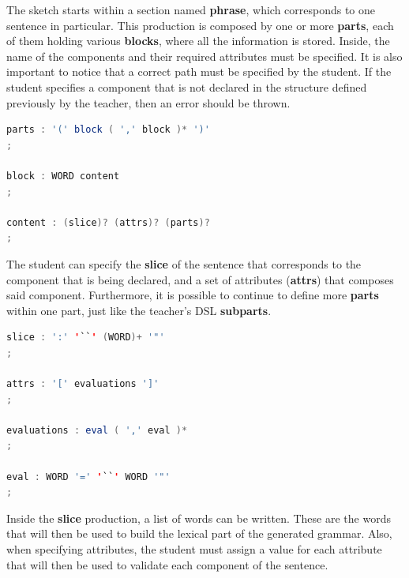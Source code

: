 The sketch starts within a section named \textbf{phrase}, which corresponds to one sentence in particular. 
This production is composed by one or more \textbf{parts}, each of them holding various \textbf{blocks}, where all the information is stored. 
Inside, the name of the components and their required attributes must be specified. 
It is also important to notice that a correct path must be specified by the student. 
If the student specifies a component that is not declared in the structure defined previously by the teacher, then an error should be thrown.

\begin{center}
\begin{minipage}{10cm}
\begin{lstlisting}[language=java, basicstyle=\small, label={lst:dsl_parts_prod}, caption=DSL parts/component/content productions]
parts : '(' block ( ',' block )* ')'
;

block : WORD content
;

content : (slice)? (attrs)? (parts)?
;
\end{lstlisting}
\end{minipage}
\end{center}

The student can specify the \textbf{slice} of the sentence that corresponds to the component that is being declared, and a set of attributes (\textbf{attrs}) that composes said component. Furthermore, it is possible to continue to define more \textbf{parts} within one part, just like the teacher's \textsc{DSL} \textbf{subparts}.

\begin{center}
\begin{minipage}{11cm}
\begin{lstlisting}[language=java, basicstyle=\small, label={lst:dsl_slice_prod}, caption=DSL slice/attrs/evaluations/eval productions]
slice : ':' '``' (WORD)+ '"'
;

attrs : '[' evaluations ']'
;

evaluations : eval ( ',' eval )*
;

eval : WORD '=' '``' WORD '"'
;
\end{lstlisting}
\end{minipage}
\end{center}

Inside the \textbf{slice} production, a list of words can be written. These are the words that will then be used to build the lexical part of the generated grammar. Also, when specifying attributes, the student must assign a value for each attribute that will then be used to validate each component of the sentence.

